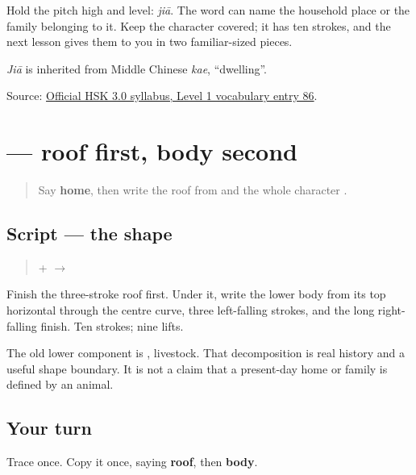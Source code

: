 Hold the pitch high and level: \emph{jiā}. The word can name the household place or the family belonging to it. Keep the character covered; it has ten strokes, and the next lesson gives them to you in two familiar-sized pieces.

\emph{Jiā} is inherited from Middle Chinese \emph{kae}, \textquotedblleft{}dwelling\textquotedblright{}.

\begin{tcolorbox}[breakable,colback=teal!4,colframe=teal!35!black,title={Before you move on}]
Source: \href{https://hsk.cn-bj.ufileos.com/3.0/\%E6\%96\%B0\%E7\%89\%88HSK\%E8\%80\%83\%E8\%AF\%95\%E5\%A4\%A7\%E7\%BA\%B21219.pdf}{Official HSK 3.0 syllabus, Level 1 vocabulary entry 86}.
\end{tcolorbox}
\section[\texorpdfstring{\zh{家} (jiā)}{家 (jiā)}]{ — roof first, body second}

\label{lesson:ZH-W12-jia}



\begin{quote}
Say \textbf{home}, then write the roof from  and the whole character .
\end{quote}

\subsection*{Script — the shape}

\begin{quote}
\textbf{} + \textbf{} $\to$ \textbf{}
\end{quote}

Finish the three-stroke roof first. Under it, write the lower body from its top horizontal through the centre curve, three left-falling strokes, and the long right-falling finish. Ten strokes; nine lifts.

The old lower component is , livestock. That decomposition is real history and a useful shape boundary. It is not a claim that a present-day home or family is defined by an animal.

\subsection*{Your turn}
Trace \textbf{} once. Copy it once, saying \textbf{roof}, then \textbf{body}.

